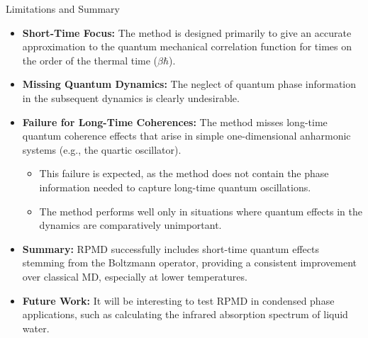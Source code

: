 \begin{frame}{Limitations and Summary}

\begin{itemize}
    \item \textbf{Short-Time Focus:} The method is designed primarily to give an accurate approximation to the quantum mechanical correlation function for times on the order of the thermal time ($\beta\hbar$).
    
    \item \textbf{Missing Quantum Dynamics:} The neglect of quantum phase information in the subsequent dynamics is clearly undesirable.
    
    \item \textbf{Failure for Long-Time Coherences:} The method misses long-time quantum coherence effects that arise in simple one-dimensional anharmonic systems (e.g., the quartic oscillator).
    \begin{itemize}
        \item This failure is expected, as the method does not contain the phase information needed to capture long-time quantum oscillations.
        \item The method performs well only in situations where quantum effects in the dynamics are comparatively unimportant.
    \end{itemize}
    
    \item \textbf{Summary:} RPMD successfully includes short-time quantum effects stemming from the Boltzmann operator, providing a consistent improvement over classical MD, especially at lower temperatures.
    
    \item \textbf{Future Work:} It will be interesting to test RPMD in condensed phase applications, such as calculating the infrared absorption spectrum of liquid water.
\end{itemize}
\end{frame}

